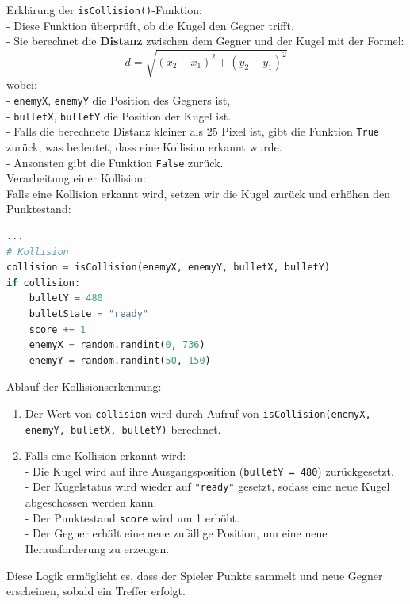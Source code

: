 \documentclass{article}
\begin{document}
Erklärung der \texttt{isCollision()}-Funktion:\\
- Diese Funktion überprüft, ob die Kugel den Gegner trifft.\\
- Sie berechnet die \textbf{Distanz} zwischen dem Gegner und der Kugel mit der Formel:
  $$
  d = \sqrt{(x_2 - x_1)^2 + (y_2 - y_1)^2}
  $$
  wobei:\\
  - \texttt{enemyX}, \texttt{enemyY} die Position des Gegners ist,\\
  - \texttt{bulletX}, \texttt{bulletY} die Position der Kugel ist.\\
- Falls die berechnete Distanz kleiner als 25 Pixel ist, gibt die Funktion \texttt{True} zurück, was bedeutet, dass eine Kollision erkannt wurde.\\
- Ansonsten gibt die Funktion \texttt{False} zurück.\\

Verarbeitung einer Kollision:\\
Falls eine Kollision erkannt wird, setzen wir die Kugel zurück und erhöhen den Punktestand:\\

\begin{lstlisting}[style=pythonstyle, language=Python]
...
# Kollision
collision = isCollision(enemyX, enemyY, bulletX, bulletY)
if collision:
    bulletY = 480
    bulletState = "ready"
    score += 1
    enemyX = random.randint(0, 736)
    enemyY = random.randint(50, 150)
\end{lstlisting}

Ablauf der Kollisionserkennung:
\begin{enumerate}
\item Der Wert von \texttt{collision} wird durch Aufruf von \texttt{isCollision(enemyX, enemyY, bulletX, bulletY)} berechnet.
\item Falls eine Kollision erkannt wird:\\
   - Die Kugel wird auf ihre Ausgangsposition (\texttt{bulletY = 480}) zurückgesetzt.\\
   - Der Kugelstatus wird wieder auf \texttt{"ready"} gesetzt, sodass eine neue Kugel abgeschossen werden kann.\\
   - Der Punktestand \texttt{score} wird um 1 erhöht.\\
   - Der Gegner erhält eine neue zufällige Position, um eine neue Herausforderung zu erzeugen.
\end{enumerate}

Diese Logik ermöglicht es, dass der Spieler Punkte sammelt und neue Gegner erscheinen, sobald ein Treffer erfolgt.
\end{document}
